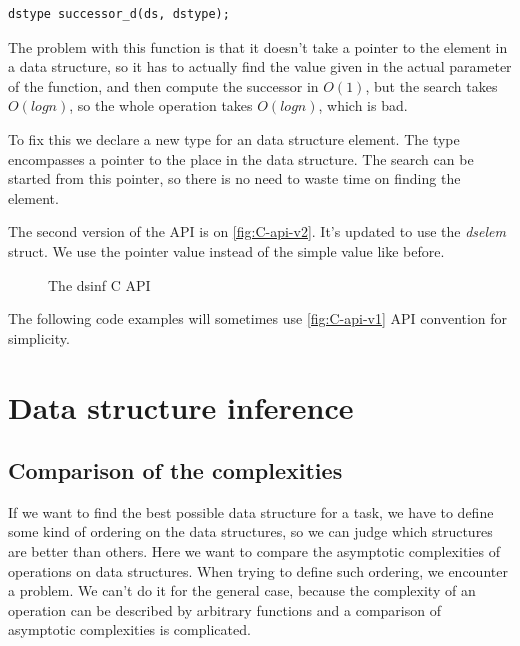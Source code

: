 \documentclass[a4paper,11pt]{article}
\begin{document}
        \begin{lstlisting}
dstype successor_d(ds, dstype);
        \end{lstlisting}

        The problem with this function is that it doesn't take a pointer to the element in a data structure, so it has
        to actually find the value given in the actual parameter of the function, and then compute the successor in
        $O(1)$, but the search takes $O(log n)$, so the whole operation takes $O(log n)$, which is bad.

        To fix this we declare a new type for an data structure element. The type encompasses a pointer to the place in
        the data structure. The search can be started from this pointer, so there is no need to waste time on finding the element.

        The second version of the API is on \autoref{fig:C-api-v2}. It's updated to use the \emph{dselem} struct. We use the pointer value instead of the simple value like before.

        \begin{figure}[h!]
            
            \caption{The dsinf C API}

            \label{fig:C-api-v2}
        \end{figure}

        The following code examples will sometimes use \autoref{fig:C-api-v1} API convention for simplicity.

\section{Data structure inference}

	\subsection{Comparison of the complexities}

		If we want to find the best possible data structure for a task, we have to define some kind of ordering
		on the data structures, so we can judge which structures are better than others. Here we want to compare the
		asymptotic complexities of operations on data structures. When trying to define such ordering, we
		encounter a problem.  We can't do it for the general case, because the complexity of an operation
        can be described by arbitrary functions and a comparison of asymptotic complexities is complicated.
\end{document}

